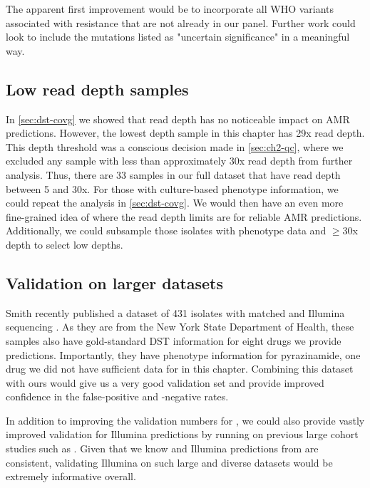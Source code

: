 The apparent first improvement would be to incorporate all WHO variants associated with resistance that are not already in our panel. Further work could look to include the mutations listed as "uncertain significance" in a meaningful way.

\subsection{Low read depth samples}

In \autoref{sec:dst-covg} we showed that read depth has no noticeable impact on AMR predictions. However, the lowest depth sample in this chapter has 29x read depth. This depth threshold was a conscious decision made in \autoref{sec:ch2-qc}, where we excluded any sample with less than approximately 30x read depth from further analysis. Thus, there are 33 samples in our full dataset that have \ont{} read depth between 5 and 30x. For those with culture-based phenotype information, we could repeat the analysis in \autoref{sec:dst-covg}. We would then have an even more fine-grained idea of where the \ont{} read depth limits are for reliable AMR predictions. Additionally, we could subsample those isolates with phenotype data and $\ge30$x depth to select low depths. 

\subsection{Validation on larger datasets}

Smith \etal{} recently published a dataset of 431 \mtb{} isolates with matched \ont{} and Illumina sequencing \cite{smith2020}. As they are from the New York State Department of Health, these samples also have gold-standard DST information for eight drugs we provide predictions. Importantly, they have phenotype information for pyrazinamide, one drug we did not have sufficient data for in this chapter. Combining this dataset with ours would give us a very good \ont{} validation set and provide improved confidence in the false-positive and -negative rates. 

In addition to improving the validation numbers for \ont{}, we could also provide vastly improved validation for \drprg{} Illumina predictions by running on previous large cohort studies such as \cite{cryptic2018,hunt2019,phelan2019}. Given that we know \ont{} and Illumina predictions from \drprg{} are consistent, validating Illumina on such large and diverse datasets would be extremely informative overall.

